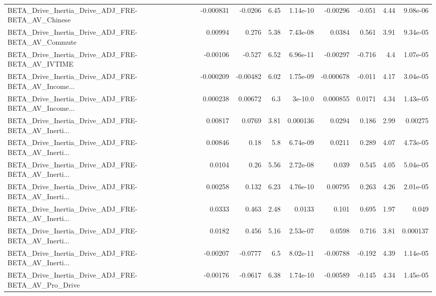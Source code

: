 \begin{tabular}{lrrrrrrrr}
BETA\_Drive\_Inertia\_Drive\_ADJ\_FRE-BETA\_AV\_Chinese   &   -0.000831 &      -0.0206 &     6.45 & 1.14e-10 &   -0.00296 &      -0.051 &         4.44 &      9.08e-06 \\
BETA\_Drive\_Inertia\_Drive\_ADJ\_FRE-BETA\_AV\_Commute   &     0.00994 &        0.276 &     5.38 & 7.43e-08 &     0.0384 &       0.561 &         3.91 &      9.34e-05 \\
BETA\_Drive\_Inertia\_Drive\_ADJ\_FRE-BETA\_AV\_IVTIME    &    -0.00106 &       -0.527 &     6.52 & 6.96e-11 &   -0.00297 &      -0.716 &          4.4 &      1.07e-05 \\
BETA\_Drive\_Inertia\_Drive\_ADJ\_FRE-BETA\_AV\_Income... &   -0.000209 &     -0.00482 &     6.02 & 1.75e-09 &  -0.000678 &      -0.011 &         4.17 &      3.04e-05 \\
BETA\_Drive\_Inertia\_Drive\_ADJ\_FRE-BETA\_AV\_Income... &    0.000238 &      0.00672 &      6.3 &  3e-10.0 &   0.000855 &      0.0171 &         4.34 &      1.43e-05 \\
BETA\_Drive\_Inertia\_Drive\_ADJ\_FRE-BETA\_AV\_Inerti... &     0.00817 &       0.0769 &     3.81 & 0.000136 &     0.0294 &       0.186 &         2.99 &       0.00275 \\
BETA\_Drive\_Inertia\_Drive\_ADJ\_FRE-BETA\_AV\_Inerti... &     0.00846 &         0.18 &      5.8 & 6.74e-09 &     0.0211 &       0.289 &         4.07 &      4.73e-05 \\
BETA\_Drive\_Inertia\_Drive\_ADJ\_FRE-BETA\_AV\_Inerti... &      0.0104 &         0.26 &     5.56 & 2.72e-08 &      0.039 &       0.545 &         4.05 &      5.04e-05 \\
BETA\_Drive\_Inertia\_Drive\_ADJ\_FRE-BETA\_AV\_Inerti... &     0.00258 &        0.132 &     6.23 & 4.76e-10 &    0.00795 &       0.263 &         4.26 &      2.01e-05 \\
BETA\_Drive\_Inertia\_Drive\_ADJ\_FRE-BETA\_AV\_Inerti... &      0.0333 &        0.463 &     2.48 &   0.0133 &      0.101 &       0.695 &         1.97 &         0.049 \\
BETA\_Drive\_Inertia\_Drive\_ADJ\_FRE-BETA\_AV\_Inerti... &      0.0182 &        0.456 &     5.16 & 2.53e-07 &     0.0598 &       0.716 &         3.81 &      0.000137 \\
BETA\_Drive\_Inertia\_Drive\_ADJ\_FRE-BETA\_AV\_Inerti... &    -0.00207 &      -0.0777 &      6.5 & 8.02e-11 &   -0.00788 &      -0.192 &         4.39 &      1.14e-05 \\
BETA\_Drive\_Inertia\_Drive\_ADJ\_FRE-BETA\_AV\_Pro\_Drive &    -0.00176 &      -0.0617 &     6.38 & 1.74e-10 &   -0.00589 &      -0.145 &         4.34 &      1.45e-05 \\

\end{tabular}
